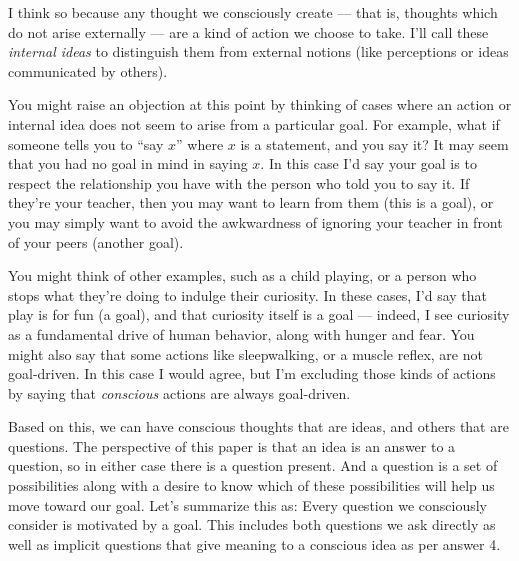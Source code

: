 \documentclass[11pt, oneside]{article}   	%
\newenvironment{answer}[1]
  {\renewcommand\theinnercustomthm{#1}\innercustomthm}
  {\endinnercustomthm}
\begin{document}
I think so because any thought we consciously create --- that is,
thoughts which do not arise externally --- are a kind of action
we choose to take. I'll call these {\em internal ideas} to
distinguish them from external notions (like perceptions or ideas
communicated by others).

You might raise an objection at this point by thinking of cases where
an action or internal idea does not seem to arise from a particular goal.
For example, what if someone tells you to ``say $x$'' where $x$ is a statement,
and you say it? It may seem that you had no goal in mind in saying $x$.
In this case I'd say your goal is to respect the relationship you have with the
person who told you to say it. If they're your teacher, then you may want to
learn from them (this is a goal), or you may simply want to avoid the
awkwardness of ignoring your teacher in front of your peers (another goal).

You might think of other examples, such as a child playing, or a person who
stops what they're doing to indulge their curiosity. In these cases, I'd say
that play is for fun (a goal), and that curiosity itself is a goal --- indeed, I
see curiosity as a fundamental drive of human behavior, along with hunger and
fear. You might also say that some actions like sleepwalking, or a muscle
reflex, are not goal-driven. In this case I would agree, but I'm excluding those
kinds of actions by saying that {\em conscious} actions are always goal-driven.

Based on this, we can have conscious thoughts that are ideas, and others that
are questions. The perspective of this paper is that an idea is an answer to a
question, so in either case there is a question present. And a question is a set
of possibilities along with a desire to know which of these possibilities will
help us move toward our goal.
Let's summarize this as:
\begin{answer}{5}
    Every question we consciously consider is motivated by a goal.
\end{answer}
This includes both questions we ask directly as well as
implicit questions that give meaning to a conscious idea as per
answer 4.

%
%
%
%
%
\end{document}
